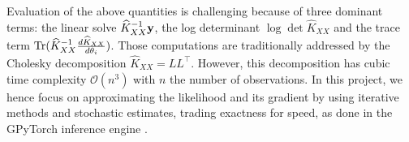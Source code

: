 \documentclass{article}
\begin{document}
Evaluation of the above quantities is challenging because of three dominant terms: the linear solve $\widehat K_{XX}^{-1} \boldsymbol{\mathbf{y}}$, the log determinant $\log \det \widehat K_{XX}$ and the trace term $\operatorname{Tr}( \widehat K_{XX}^{-1} \frac{d \widehat K_{XX}}{d\theta_i})$. Those computations are traditionally addressed by the Cholesky decomposition $\widehat K_{XX} = LL^\top$. However, this decomposition has cubic time complexity $\mathcal O(n^3)$ with $n$ the number of observations. In this project, we hence focus on approximating the likelihood and its gradient by using iterative methods and stochastic estimates, trading exactness for speed, as done in the GPyTorch inference engine \cite{gardner_gpytorch_2021}.

\end{document}
